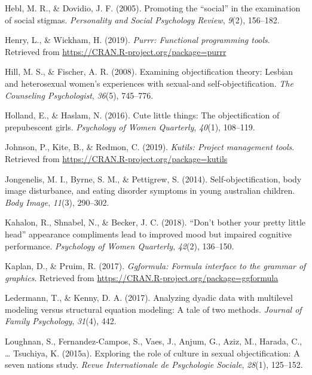 \documentclass[man]{apa6}
\begin{document}
\hypertarget{ref-hebl2005promoting}{}
Hebl, M. R., \& Dovidio, J. F. (2005). Promoting the ``social'' in the
examination of social stigmas. \emph{Personality and Social Psychology
Review}, \emph{9}(2), 156--182.

\hypertarget{ref-R-purrr}{}
Henry, L., \& Wickham, H. (2019). \emph{Purrr: Functional programming
tools}. Retrieved from \url{https://CRAN.R-project.org/package=purrr}

\hypertarget{ref-hill2008examining}{}
Hill, M. S., \& Fischer, A. R. (2008). Examining objectification theory:
Lesbian and heterosexual women's experiences with sexual-and
self-objectification. \emph{The Counseling Psychologist}, \emph{36}(5),
745--776.

\hypertarget{ref-holland2016}{}
Holland, E., \& Haslam, N. (2016). Cute little things: The
objectification of prepubescent girls. \emph{Psychology of Women
Quarterly}, \emph{40}(1), 108--119.

\hypertarget{ref-R-kutils}{}
Johnson, P., Kite, B., \& Redmon, C. (2019). \emph{Kutils: Project
management tools}. Retrieved from
\url{https://CRAN.R-project.org/package=kutils}

\hypertarget{ref-jongenelis2014}{}
Jongenelis, M. I., Byrne, S. M., \& Pettigrew, S. (2014).
Self-objectification, body image disturbance, and eating disorder
symptoms in young australian children. \emph{Body Image}, \emph{11}(3),
290--302.

\hypertarget{ref-kahalon2018don}{}
Kahalon, R., Shnabel, N., \& Becker, J. C. (2018). ``Don't bother your
pretty little head'' appearance compliments lead to improved mood but
impaired cognitive performance. \emph{Psychology of Women Quarterly},
\emph{42}(2), 136--150.

\hypertarget{ref-R-ggformula}{}
Kaplan, D., \& Pruim, R. (2017). \emph{Ggformula: Formula interface to
the grammar of graphics}. Retrieved from
\url{https://CRAN.R-project.org/package=ggformula}

\hypertarget{ref-ledermann2017analyzing}{}
Ledermann, T., \& Kenny, D. A. (2017). Analyzing dyadic data with
multilevel modeling versus structural equation modeling: A tale of two
methods. \emph{Journal of Family Psychology}, \emph{31}(4), 442.

\hypertarget{ref-loughnan2015exploring}{}
Loughnan, S., Fernandez-Campos, S., Vaes, J., Anjum, G., Aziz, M.,
Harada, C., \ldots{} Tsuchiya, K. (2015a). Exploring the role of culture
in sexual objectification: A seven nations study. \emph{Revue
Internationale de Psychologie Sociale}, \emph{28}(1), 125--152.
\end{document}
